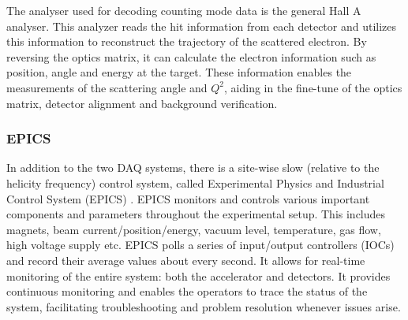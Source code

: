 The analyser used for decoding counting mode data is the general Hall A analyser.
This analyzer reads the hit information from each detector and utilizes this information
to reconstruct the trajectory of the scattered electron. By reversing the optics matrix, it can
calculate the electron information such as position, angle and energy at the target. These
information enables the measurements of the scattering angle and $Q^2$, 
aiding in the fine-tune of the optics matrix, detector alignment and background verification.

\subsubsection{EPICS}
In addition to the two DAQ systems, there is a site-wise slow (relative to the helicity frequency) 
control system, called Experimental Physics and Industrial Control System (EPICS) \cite{EPICS}.
EPICS monitors and controls various important components and parameters throughout
the experimental setup. This includes magnets, beam current/position/energy, 
vacuum level, temperature, gas flow, high voltage supply etc. EPICS polls a series of 
input/output controllers (IOCs) and record their average values about every second.
It allows for real-time monitoring of the entire system: both the accelerator and detectors. 
It provides continuous monitoring and enables the operators to trace the status of the system, facilitating troubleshooting and problem resolution whenever issues arise.
